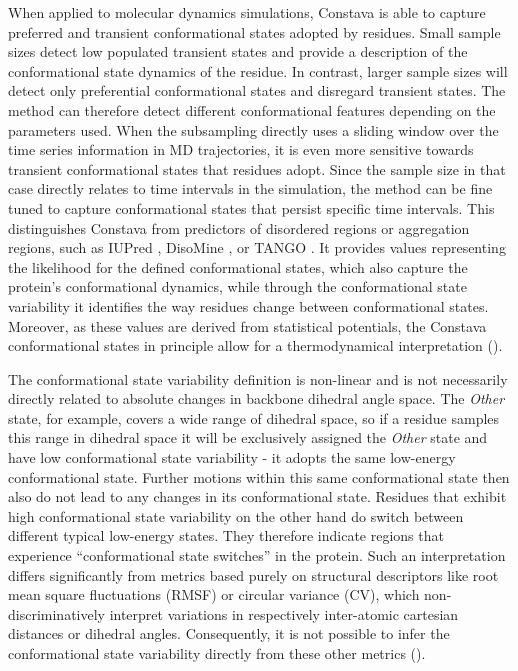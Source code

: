 When applied to molecular dynamics simulations, Constava is able to capture preferred and transient conformational states adopted by residues. Small sample sizes detect low populated transient states and provide a description of the conformational state dynamics of the residue. In contrast, larger sample sizes will detect only preferential conformational states and disregard transient states. The method can therefore detect different conformational features depending on the parameters used. When the subsampling directly uses a sliding window over the time series information in MD trajectories, it is even more sensitive towards transient conformational states that residues adopt. Since the sample size in that case directly relates to time intervals in the simulation, the method can be fine tuned to capture conformational states that persist specific time intervals. This distinguishes Constava from predictors of disordered regions or aggregation regions, such as IUPred \cite{erdos_iupred3_2021}, DisoMine \cite{orlando_prediction_2022}, or TANGO \cite{fernandez-escamilla_prediction_2004}. It provides values representing the likelihood for the defined conformational states, which also capture the protein's conformational dynamics, while through the conformational state variability it identifies the way residues change between conformational states. Moreover, as these values are derived from statistical potentials, the Constava conformational states in principle allow for a thermodynamical interpretation ().

The conformational state variability definition is non-linear and is not necessarily directly related to absolute changes in backbone dihedral angle space. The \textit{Other} state, for example, covers a wide range of dihedral space, so if a residue samples this range in dihedral space it will be exclusively assigned the \textit{Other} state and have low conformational state variability - it adopts the same low-energy conformational state. Further motions within this same conformational state then also do not lead to any changes in its conformational state. Residues that exhibit high conformational state variability on the other hand do switch between different typical low-energy states. They therefore indicate regions that experience ``conformational state switches'' in the protein. Such an interpretation differs significantly from metrics based purely on structural descriptors like root mean square fluctuations (RMSF) or circular variance (CV), which non-discriminatively interpret variations in respectively inter-atomic cartesian distances or dihedral angles. Consequently, it is not possible to infer the conformational state variability directly from these other metrics ().

